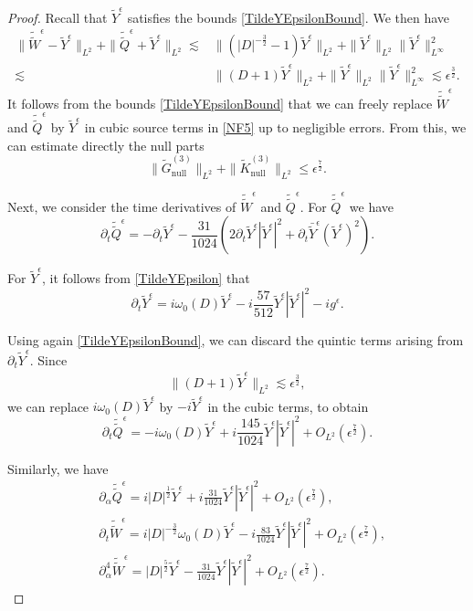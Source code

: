 \documentclass[12pt]{amsart}
\theoremstyle{remark}
\theoremstyle{definition}
\numberwithin{equation}{section}
\newcommand{\e}{\epsilon}
\newcommand{\al}{\alpha}
\newcommand{\f}{\frac}
\begin{document}
\begin{proof}
Recall that $\tilde{Y}^\epsilon$ satisfies the bounds \eqref{TildeYEpsilonBound}. We then have
\begin{align*}
\|\tilde{\tilde{W}}^\epsilon - \tilde{Y}^\epsilon\|_{L^2} + \|\tilde{\tilde{Q}}^\epsilon + \tilde{Y}^\epsilon\|_{L^2}\lesssim& \|(|D|^{-\f32}-1)\tilde{Y}^\epsilon\|_{L^2}+\|\tilde{Y}^\epsilon\|_{L^2}\|\tilde{Y}^\epsilon\|^2_{L^\infty}\\
\lesssim& \|(D+1)\tilde{Y}^\epsilon\|_{L^2}+\|\tilde{Y}^\epsilon\|_{L^2}\|\tilde{Y}^\epsilon\|^2_{L^\infty}\lesssim\e^{\f32}.
\end{align*}
It follows from the bounds \eqref{TildeYEpsilonBound} that we can freely replace $\tilde{\tilde{W}}^\e$ and $\tilde{\tilde{Q}}^\e$ by $\tilde{Y}^\e$ in cubic source terms in \eqref{NF5} up to negligible errors. From this, we can estimate directly the null parts  
\[
\| \tilde{G}_{\text{null}}^{(3)} \|_{L^2} + \| \tilde{K}_{\text{null}}^{(3)} \|_{L^2} \leq \epsilon^{\frac{7}{2}}.
\]

Next, we consider the time derivatives of $\tilde{\tilde{W}}^\e$ and $\tilde{\tilde{Q}}^\e$. For $\tilde{\tilde{Q}}^\e$ we have  
\[
\partial_t \tilde{\tilde{Q}}^\e = -\partial_t \tilde{Y}^\e - \frac{31}{1024} \left(2\partial_t \tilde{Y}^\e |\tilde{Y}^\e|^2 + \partial_t \bar{\tilde{Y}}^\e (\tilde{Y}^\e)^2\right).
\]

For $\tilde{Y}^\e$, it follows from \eqref{TildeYEpsilon} that
\[
\partial_t \tilde{Y}^\e = i\omega_0 (D) \tilde{Y}^\e -i\frac{57}{512} \tilde{Y}^\e|\tilde{Y}^\e|^2 - ig^\e.
\]

Using again \eqref{TildeYEpsilonBound}, we can discard the quintic terms arising from $\partial_t \tilde{Y}^\e$. Since
\begin{align*}
\|(D+1)\tilde{Y}^{\e}\|_{L^2}\lesssim \epsilon^\f32,
\end{align*}
we can replace $i\omega_0 (D) \tilde{Y}^\e$ by $-i \tilde{Y}^\e$ in the cubic terms, to obtain 
\[
\partial_t \tilde{\tilde{Q}}^\e = -i\omega_0 (D) \tilde{Y}^\e + i\frac{145}{1024} \tilde{Y}^\e |\tilde{Y}^\e|^2 + O_{L^2} (\epsilon^{\frac{7}{2}}).
\]

Similarly, we have
\begin{align*}
&\partial_{\al} \tilde{\tilde{Q}}^\e = i |D|^{\frac{1}{2}}\tilde{Y}^\e +i\frac{31}{1024} \tilde{Y}^\e |\tilde{Y}^\e|^2 + O_{L^2} (\epsilon^{\frac{7}{2}}), \\
&\partial_t \tilde{\tilde{W}}^\e = i |D|^{-\frac{3}{2}} \omega_0 (D) \tilde{Y}^\e-i\f{83}{1024}\tilde{Y}^\e |\tilde{Y}^\e|^2 + O_{L^2} (\epsilon^{\frac{7}{2}}), \\
& \partial_\al^4 \tilde{\tilde{W}}^\e = |D|^{\f52} \tilde{Y}^\e - \frac{31}{1024} \tilde{Y}^\e |\tilde{Y}^\e|^2 + O_{L^2} (\epsilon^{\frac{7}{2}}).
\end{align*}


\end{proof}
\end{document}
